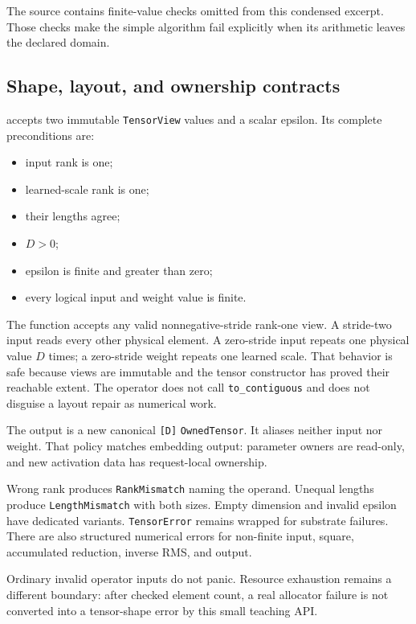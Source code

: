 \documentclass[
  10pt,
]{article}
\providecommand{\tightlist}{%
  \setlength{\itemsep}{0pt}\setlength{\parskip}{0pt}}
\begin{document}
The source contains finite-value checks omitted from this condensed
excerpt. Those checks make the simple algorithm fail explicitly when its
arithmetic leaves the declared domain.

\subsection{Shape, layout, and ownership
contracts}\label{shape-layout-and-ownership-contracts}

\texttt{} accepts two immutable
\texttt{TensorView} values and a scalar epsilon. Its complete
preconditions are:

\begin{itemize}
\tightlist
\item
  input rank is one;
\item
  learned-scale rank is one;
\item
  their lengths agree;
\item
  \(D>0\);
\item
  epsilon is finite and greater than zero;
\item
  every logical input and weight value is finite.
\end{itemize}

The function accepts any valid nonnegative-stride rank-one view. A
stride-two input reads every other physical element. A zero-stride input
repeats one physical value \(D\) times; a zero-stride weight repeats one
learned scale. That behavior is safe because views are immutable and the
tensor constructor has proved their reachable extent. The operator does
not call \texttt{to\_contiguous} and does not disguise a layout repair
as numerical work.

The output is a new canonical \texttt{{[}D{]}} \texttt{OwnedTensor}. It
aliases neither input nor weight. That policy matches embedding output:
parameter owners are read-only, and new activation data has
request-local ownership.

Wrong rank produces \texttt{RankMismatch} naming the operand. Unequal
lengths produce \texttt{LengthMismatch} with both sizes. Empty dimension
and invalid epsilon have dedicated variants. \texttt{TensorError}
remains wrapped for substrate failures. There are also structured
numerical errors for non-finite input, square, accumulated reduction,
inverse RMS, and output.

Ordinary invalid operator inputs do not panic. Resource exhaustion
remains a different boundary: after checked element count, a real
allocator failure is not converted into a tensor-shape error by this
small teaching API.
\end{document}

